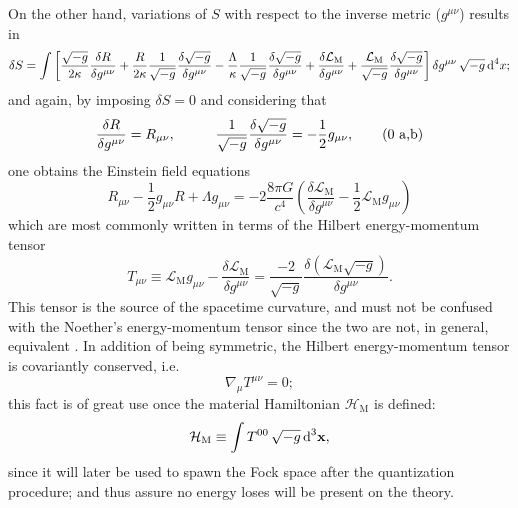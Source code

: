 On the other hand, variations of $S$ with respect to the inverse metric ($g^{\mu\nu}$) results in
\begin{multline}
	\delta S=\int \left[\frac{\sqrt{-g}}{2\kappa}\frac{\delta R}{\delta g^{\mu\nu}}+\frac{R}{2\kappa}\frac{1}{\sqrt{-g}}\frac{\delta \sqrt{-g}}{\delta g^{\mu\nu}}-\frac{\Lambda}{\kappa}\frac{1}{\sqrt{-g}}\frac{\delta\sqrt{-g}}{\delta g^{\mu\nu}}+\frac{\delta\mathcal{L}_{\text{M}}}{\delta g^{\mu\nu}}+\frac{\mathcal{L}_{\text{M}}}{\sqrt{-g}}\frac{\delta\sqrt{-g}}{\delta g^{\mu\nu}}\right]\delta g^{\mu\nu}\,\sqrt{-g}\,\text{d}^4x;
\end{multline}
and again, by imposing $\delta S=0$ and considering that
\begin{subequations}
	\begin{gather}
		\frac{\delta R}{\delta g^{\mu\nu}}=R_{\mu\nu},\hspace{1.0cm}\frac{1}{\sqrt{-g}}\frac{\delta\sqrt{-g}}{\delta g^{\mu\nu}}=-\frac{1}{2}g_{\mu\nu},\tag{\theequation \,\,a,b}
	\end{gather}
\end{subequations}
one obtains the Einstein field equations
\begin{equation}\label{eq: Einstein Field Equations}
	R_{\mu\nu}-\frac{1}{2}g_{\mu\nu}R+\Lambda g_{\mu\nu}=-2\frac{8\pi G}{c^4}\left(\frac{\delta\mathcal{L}_{\text{M}}}{\delta g^{\mu\nu}}-\frac{1}{2}\mathcal{L}_{\text{M}}g_{\mu\nu}\right)
\end{equation}
which are most commonly written in terms of the Hilbert energy-momentum tensor
\begin{equation}\label{eq: Hilbert energy-momentum tensor}
	T_{\mu\nu}\equiv \mathcal{L}_{\text{M}}g_{\mu\nu}-\frac{\delta\mathcal{L}_{\text{M}}}{\delta g^{\mu\nu}}=\frac{-2}{\sqrt{-g}}\frac{\delta \left(\mathcal{L}_{\text{M}}\sqrt{-g}\right)}{\delta g^{\mu\nu}}.
\end{equation}
This tensor is the source of the spacetime curvature, and must not be confused with the Noether's energy-momentum tensor since the two are not, in general, equivalent \cite{Energy-MomentumTensor}. In addition of being symmetric, the Hilbert energy-momentum tensor is covariantly conserved, i.e.
\begin{equation}
	\nabla_\mu T^{\mu\nu}=0;
\end{equation}
this fact is of great use once the material Hamiltonian $\mathcal{H}_{\text{M}}$ is defined:
\begin{equation}\label{eq: General Hamiltonian}
	\mathcal{H}_{\text{M}}\equiv \int T^{00}\,\sqrt{-g}\,\text{d}^3\mathbf{x},
\end{equation}
since it will later be used to spawn the Fock space after the quantization procedure; and thus assure no energy loses will be present on the theory.
